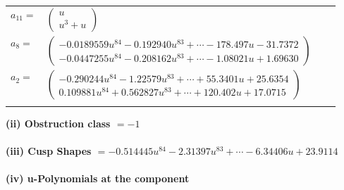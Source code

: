 \documentclass[1p]{elsarticle_modified}
\theoremstyle{definition}
\begin{document}
\begin{tabular}{m{7pt} m{180pt} m{7pt} m{180pt} }
\flushright $a_{11}=$&$\begin{pmatrix}u\\u^3+u\end{pmatrix}$ \\
\flushright $a_{8}=$&$\begin{pmatrix}-0.0189559 u^{84}-0.192940 u^{83}+\cdots-178.497 u-31.7372\\-0.0447255 u^{84}-0.208162 u^{83}+\cdots-1.08021 u+1.69630\end{pmatrix}$ \\
\flushright $a_{2}=$&$\begin{pmatrix}-0.290244 u^{84}-1.22579 u^{83}+\cdots+55.3401 u+25.6354\\0.109881 u^{84}+0.562827 u^{83}+\cdots+120.402 u+17.0715\end{pmatrix}$\\&\end{tabular}
\flushleft \textbf{(ii) Obstruction class $= -1$}\\~\\
\flushleft \textbf{(iii) Cusp Shapes $= -0.514445 u^{84}-2.31397 u^{83}+\cdots-6.34406 u+23.9114$}\\~\\
\newpage\renewcommand{\arraystretch}{1}
\flushleft \textbf{(iv) u-Polynomials at the component}\newline \\
\end{document}
